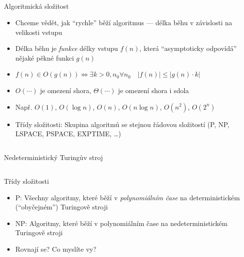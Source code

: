 \documentclass{beamer}
\begin{document}
\subsection{}
\begin{frame}{Algoritmická složitost}
\begin{itemize}
\item Chceme vědět, jak ``rychle'' běží algoritmus --- délka běhu v závislosti na velikosti vstupu
\item Délka běhu je {\em funkce} délky vstupu $f(n)$, která ``asymptoticky odpovídá'' nějaké pěkné funkci $g(n)$
\item $f(n) \in O(g(n)) \Leftrightarrow \exists k > 0, n_0 \forall n_0 \quad |f(n)| \le |g(n) \cdot k|$
\item $O(\cdots)$ je omezení shora, $\Theta(\cdots)$ je omezení shora i sdola
\item Např. $O(1)$, $O(\log n)$, $O(n)$, $O(n\log n)$, $O(n^2)$, $O(2^n)$
\pause
\item Třídy složitosti: Skupina algoritmů se stejnou řádovou složitostí (P, NP, LSPACE, PSPACE, EXPTIME, \dots)
\end{itemize}
\end{frame}

\subsection{}
\begin{frame}{Nedeterministický Turingův stroj}
\end{frame}

\subsection{}
\begin{frame}{Třídy složitosti}
\begin{itemize}
\item P: Všechny algoritmy, které běží v {\em polynomiálním čase} na deterministickém (``obyčejném'') Turingově stroji
\item NP: Algoritmy, které běží v polynomiálním čase na nedeterministickém Turingově stroji
\item Rovnají se? Co myslíte vy?
\end{itemize}
\end{frame}
\end{document}
